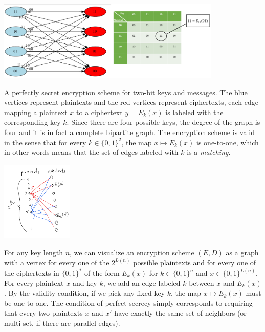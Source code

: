 \begin{marginfigure}
\centering
\includegraphics[width=\linewidth, height=1.5in, keepaspectratio]{../figure/onetimepadtwobits.png}
\caption{A perfectly secret encryption scheme for two-bit keys and
messages. The blue vertices represent plaintexts and the red vertices
represent ciphertexts, each edge mapping a plaintext \(x\) to a
ciphertext \(y=E_k(x)\) is labeled with the corresponding key \(k\).
Since there are four possible keys, the degree of the graph is four and
it is in fact a complete bipartite graph. The encryption scheme is valid
in the sense that for every \(k\in \{0,1\}^2\), the map
\(x \mapsto E_k(x)\) is one-to-one, which in other words means that the
set of edges labeled with \(k\) is a \emph{matching}.}
\label{onetimepadtwofig}
\end{marginfigure}


\begin{marginfigure}
\centering
\includegraphics[width=\linewidth, height=1.5in, keepaspectratio]{../figure/perfectsecrecy.png}
\caption{For any key length \(n\), we can visualize an encryption scheme
\((E,D)\) as a graph with a vertex for every one of the \(2^{L(n)}\)
possible plaintexts and for every one of the ciphertexts in
\(\{0,1\}^*\) of the form \(E_k(x)\) for \(k\in \{0,1\}^n\) and
\(x\in \{0,1\}^{L(n)}\). For every plaintext \(x\) and key \(k\), we add
an edge labeled \(k\) between \(x\) and \(E_k(x)\). By the validity
condition, if we pick any fixed key \(k\), the map \(x \mapsto E_k(x)\)
must be one-to-one. The condition of perfect secrecy simply corresponds
to requiring that every two plaintexts \(x\) and \(x'\) have exactly the
same set of neighbors (or multi-set, if there are parallel edges).}
\label{perfectsecfig}
\end{marginfigure}

